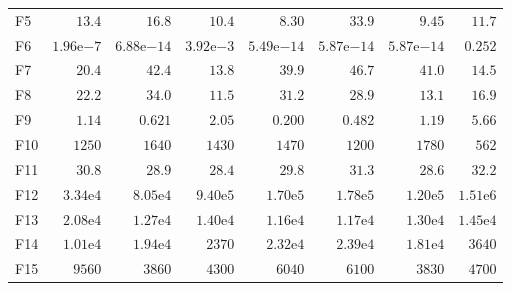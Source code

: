 \begin{tabular}{lrrrrrrr}
F5 & $13.4$ & $16.8$ & $10.4$ & $8.30$ & $33.9$ & $9.45$ & $11.7$ \\
F6 & $1.96\mathrm{e}{-7}$ & $6.88\mathrm{e}{-14}$ & $3.92\mathrm{e}{-3}$ & $5.49\mathrm{e}{-14}$ & $5.87\mathrm{e}{-14}$ & $5.87\mathrm{e}{-14}$ & $0.252$ \\
F7 & $20.4$ & $42.4$ & $13.8$ & $39.9$ & $46.7$ & $41.0$ & $14.5$ \\
F8 & $22.2$ & $34.0$ & $11.5$ & $31.2$ & $28.9$ & $13.1$ & $16.9$ \\
F9 & $1.14$ & $0.621$ & $2.05$ & $0.200$ & $0.482$ & $1.19$ & $5.66$ \\
F10 & $1250$ & $1640$ & $1430$ & $1470$ & $1200$ & $1780$ & $562$ \\
F11 & $30.8$ & $28.9$ & $28.4$ & $29.8$ & $31.3$ & $28.6$ & $32.2$ \\
F12 & $3.34\mathrm{e}{4}$ & $8.05\mathrm{e}{4}$ & $9.40\mathrm{e}{5}$ & $1.70\mathrm{e}{5}$ & $1.78\mathrm{e}{5}$ & $1.20\mathrm{e}{5}$ & $1.51\mathrm{e}{6}$ \\
F13 & $2.08\mathrm{e}{4}$ & $1.27\mathrm{e}{4}$ & $1.40\mathrm{e}{4}$ & $1.16\mathrm{e}{4}$ & $1.17\mathrm{e}{4}$ & $1.30\mathrm{e}{4}$ & $1.45\mathrm{e}{4}$ \\
F14 & $1.01\mathrm{e}{4}$ & $1.94\mathrm{e}{4}$ & $2370$ & $2.32\mathrm{e}{4}$ & $2.39\mathrm{e}{4}$ & $1.81\mathrm{e}{4}$ & $3640$ \\
F15 & $9560$ & $3860$ & $4300$ & $6040$ & $6100$ & $3830$ & $4700$ \\
\bottomrule
\end{tabular}
